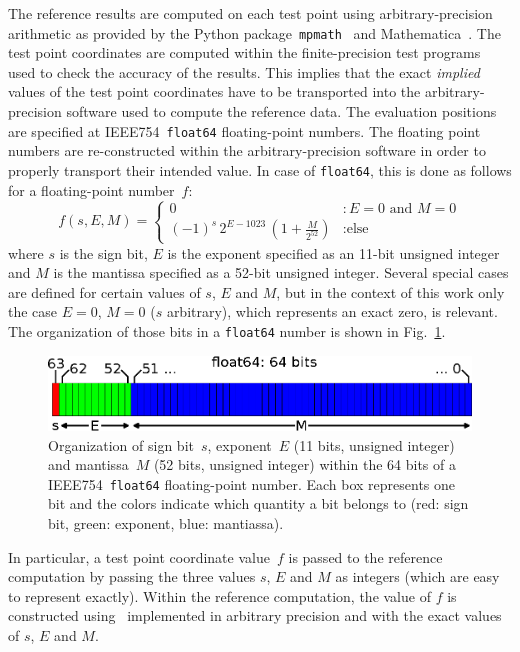 The reference results are computed on each test point using arbitrary-precision arithmetic
as provided by the Python package~\texttt{mpmath}~\cite{mpmath} and Mathematica~\cite{Mathematica}.
The test point coordinates are computed within the finite-precision test programs used to check the accuracy of the results.
This implies that the exact \textit{implied} values of the test point coordinates have to be transported
into the arbitrary-precision software used to compute the reference data.
The evaluation positions are specified at IEEE754~\texttt{float64} floating-point numbers.
The floating point numbers are re-constructed within the arbitrary-precision software
in order to properly transport their intended value.
In case of \texttt{float64}, this is done as follows for a floating-point number~$f$:
\begin{equation}
 f(s, E, M) =
 \begin{cases}
   0                                                             &: E=0 \textrm{ and } M=0 \\
   (-1)^s \, 2^{E - 1023} \, \left( 1 + \frac{M}{2^{52}} \right) &: \textrm{else}
  \end{cases} \label{eqn:float64}
\end{equation}
where $s$ is the sign bit, $E$ is the exponent specified as an 11-bit unsigned integer
and $M$ is the mantissa specified as a 52-bit unsigned integer.
Several special cases are defined for certain values of $s$, $E$ and $M$,
but in the context of this work only the case $E=0$, $M=0$ ($s$ arbitrary),
which represents an exact zero, is relevant.
The organization of those bits in a \texttt{float64} number is shown in Fig.~\ref{fig:float64}.
\begin{figure}[htbp]
 \centering
 \includegraphics{img/IEEE754_float64.eps}
 \caption{Organization of sign bit~$s$, exponent~$E$ (11 bits, unsigned integer)
          and mantissa~$M$ (52 bits, unsigned integer) within the 64 bits
          of a IEEE754~\texttt{float64} floating-point number.
          Each box represents one bit and the colors indicate which quantity a bit belongs to
          (red: sign bit, green: exponent, blue: mantiassa).}
 \label{fig:float64}
\end{figure}
In particular, a test point coordinate value~$f$ is passed to the reference computation
by passing the three values $s$, $E$ and $M$ as integers (which are easy to represent exactly).
Within the reference computation, the value of $f$ is constructed using~ implemented
in arbitrary precision and with the exact values of $s$, $E$ and $M$.

